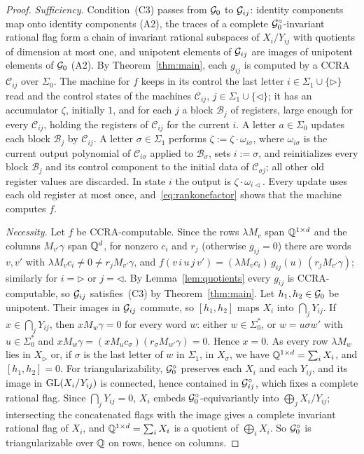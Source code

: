 \begin{proof}
\emph{Sufficiency.} Condition~(C3) passes from $\mathcal{G}_0$ to $\mathcal{G}_{ij}$: identity components map onto identity components (A2), the traces of a complete $\mathcal{G}_0^\circ$-invariant rational flag form a chain of invariant rational subspaces of $X_i/Y_{ij}$ with quotients of dimension at most one, and unipotent elements of $\mathcal{G}_{ij}$ are images of unipotent elements of $\mathcal{G}_0$ (A2). By Theorem~\ref{thm:main}, each $g_{ij}$ is computed by a CCRA $\mathcal C_{ij}$ over $\Sigma_0$. The machine for $f$ keeps in its control the last letter $i\in\Sigma_1\cup\{\triangleright\}$ read and the control states of the machines $\mathcal C_{ij}$, $j\in\Sigma_1\cup\{\triangleleft\}$; it has an accumulator $\zeta$, initially $1$, and for each $j$ a block $\mathcal B_j$ of registers, large enough for every $\mathcal C_{ij}$, holding the registers of $\mathcal C_{ij}$ for the current $i$. A letter $a\in\Sigma_0$ updates each block $\mathcal B_j$ by $\mathcal C_{ij}$. A letter $\sigma\in\Sigma_1$ performs $\zeta:=\zeta\cdot\omega_{i\sigma}$, where $\omega_{i\sigma}$ is the current output polynomial of $\mathcal C_{i\sigma}$ applied to $\mathcal B_\sigma$, sets $i:=\sigma$, and reinitializes every block $\mathcal B_j$ and its control component to the initial data of $\mathcal C_{\sigma j}$; all other old register values are discarded. In state $i$ the output is $\zeta\cdot\omega_{i\triangleleft}$. Every update uses each old register at most once, and~\eqref{eq:rankonefactor} shows that the machine computes $f$.

\emph{Necessity.} Let $f$ be CCRA-computable. Since the rows $\lambda M_v$ span $\mathbb{Q}^{1\times d}$ and the columns $M_{v'}\gamma$ span $\mathbb{Q}^d$, for nonzero $c_i$ and $r_j$ (otherwise $g_{ij}=0$) there are words $v,v'$ with $\lambda M_vc_i\ne0\ne r_jM_{v'}\gamma$, and $f(v\,i\,u\,j\,v')=(\lambda M_vc_i)\,g_{ij}(u)\,(r_jM_{v'}\gamma)$; similarly for $i=\triangleright$ or $j=\triangleleft$. By Lemma~\ref{lem:quotients} every $g_{ij}$ is CCRA-computable, so $\mathcal{G}_{ij}$ satisfies~(C3) by Theorem~\ref{thm:main}. Let $h_1,h_2\in\mathcal{G}_0$ be unipotent. Their images in $\mathcal{G}_{ij}$ commute, so $[h_1,h_2]$ maps $X_i$ into $\bigcap_jY_{ij}$. If $x\in\bigcap_jY_{ij}$, then $xM_w\gamma=0$ for every word $w$: either $w\in\Sigma_0^*$, or $w=u\sigma w'$ with $u\in\Sigma_0^*$ and $xM_w\gamma=(xM_uc_\sigma)(r_\sigma M_{w'}\gamma)=0$. Hence $x=0$. As every row $\lambda M_w$ lies in $X_\triangleright$ or, if $\sigma$ is the last letter of $w$ in $\Sigma_1$, in $X_\sigma$, we have $\mathbb{Q}^{1\times d}=\sum_iX_i$, and $[h_1,h_2]=0$. For triangularizability, $\mathcal{G}_0^\circ$ preserves each $X_i$ and each $Y_{ij}$, and its image in $\mathrm{GL}(X_i/Y_{ij})$ is connected, hence contained in $\mathcal{G}_{ij}^\circ$, which fixes a complete rational flag. Since $\bigcap_jY_{ij}=0$, $X_i$ embeds $\mathcal{G}_0^\circ$-equivariantly into $\bigoplus_jX_i/Y_{ij}$; intersecting the concatenated flags with the image gives a complete invariant rational flag of $X_i$, and $\mathbb{Q}^{1\times d}=\sum_iX_i$ is a quotient of $\bigoplus_iX_i$. So $\mathcal{G}_0^\circ$ is triangularizable over $\mathbb{Q}$ on rows, hence on columns.


\end{proof}
